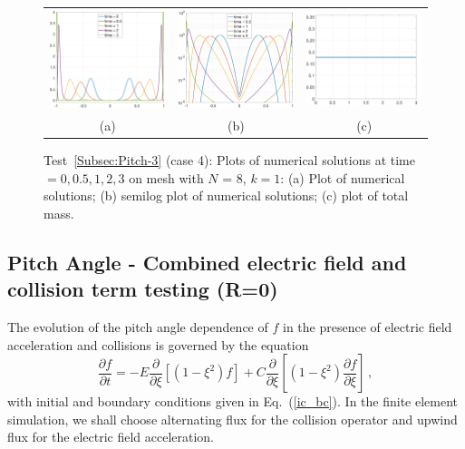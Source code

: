 \documentclass[preprint,11pt]{elsarticle}
\newcommand{\bq}{\begin{equation}}
\newcommand{\eq}{\end{equation}}
\begin{document}
\begin{figure}[H]
\centering
\begin{tabular}{ccc}
\includegraphics[width=.3\textwidth]{./NumFig/Test4-3-4-L8D2}
&\includegraphics[width=.3\textwidth]{./NumFig/Test4-3-4-L8D2-log}
&\includegraphics[width=.3\textwidth]{./NumFig/Test4-3-k1-4-Con_v2}
\\
(a) & (b) &(c)
\end{tabular}
\caption{Test~\ref{Subsec:Pitch-3} (case 4): Plots of numerical solutions at time $=0,0.5,1,2,3$ on mesh with $N$ = 8, $k=1$: (a) Plot of numerical solutions; (b) semilog plot of numerical solutions; (c) plot of total mass.}\label{Fig:Pitch-3-4}
\end{figure}


\subsection{Pitch Angle - Combined electric field and collision term testing (R=0)}
\label{Subsec:Pitch-4}
The evolution of the pitch angle dependence of $f$ in the presence of electric field acceleration and collisions is governed by the equation
%
\bq
\label{pitch_E_coll_eq}
\frac{\partial f}{\partial t}= 
- E \frac{\partial}{\partial\xi} \left[ \left(1-\xi^2\right) f \right] + C \frac{\partial}{\partial\xi} \left[ \left(1-\xi^2\right) \frac{\partial f}{\partial \xi} \right]\, ,
\eq
%
with initial and boundary conditions given in Eq.~(\ref{ic_bc}). In the finite element simulation, we shall choose alternating flux for the collision operator and upwind flux for the electric field acceleration.
\end{document}
